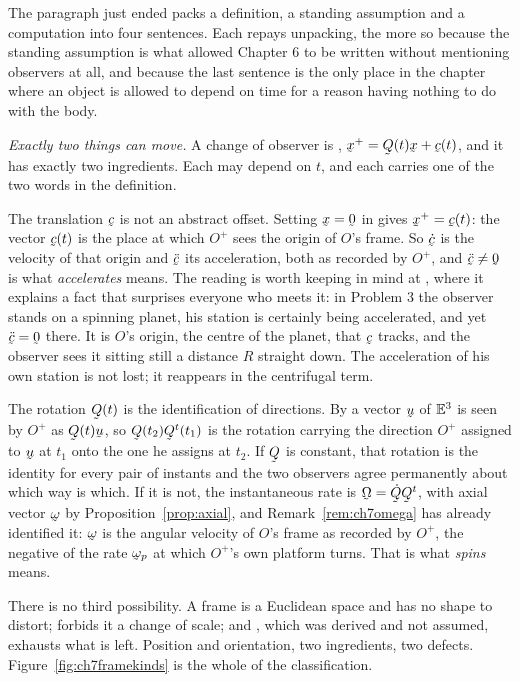 \begin{remark}\label{rem:ch7whatinertial}
The paragraph just ended packs a definition, a standing assumption and a
computation into four sentences. Each repays unpacking, the more so
because the standing assumption is what allowed Chapter 6 to be written
without mentioning observers at all, and because the last sentence is the
only place in the chapter where an object is allowed to depend on time
for a reason having nothing to do with the body.

\emph{Exactly two things can move.} A change of observer is ,
$\bx^{+}=\bQ(t)\bx+\bc(t)$, and it has exactly two ingredients. Each may
depend on $t$, and each carries one of the two words in the definition.

The translation $\bc$ is not an abstract offset. Setting $\bx=\bze$ in
 gives $\bx^{+}=\bc(t)$: the vector $\bc(t)$ is the place at
which $O^{+}$ sees the origin of $O$'s frame. So $\dot\bc$ is the
velocity of that origin and $\ddot\bc$ its acceleration, both as recorded
by $O^{+}$, and $\ddot\bc\neq\bze$ is what \emph{accelerates} means. The
reading is worth keeping in mind at , where it explains a fact
that surprises everyone who meets it: in Problem 3 the observer stands on
a spinning planet, his station is certainly being accelerated, and yet
$\ddot\bc=\bze$ there. It is $O$'s origin, the centre of the planet, that
$\bc$ tracks, and the observer sees it sitting still a distance $R$
straight down. The acceleration of his own station is not lost; it
reappears in the centrifugal term.

The rotation $\bQ(t)$ is the identification of directions. By  a
vector $\bu$ of $\mathbb{E}^{3}$ is seen by $O^{+}$ as $\bQ(t)\bu$, so
$\bQ(t_{2})\bQ^{t}(t_{1})$ is the rotation carrying the direction $O^{+}$
assigned to $\bu$ at $t_{1}$ onto the one he assigns at $t_{2}$. If $\bQ$
is constant, that rotation is the identity for every pair of instants and
the two observers agree permanently about which way is which. If it is
not, the instantaneous rate is $\bOm=\dot\bQ\bQ^{t}$, with axial vector
$\bom$ by Proposition~\ref{prop:axial}, and Remark~\ref{rem:ch7omega} has
already identified it: $\bom$ is the angular velocity of $O$'s frame as
recorded by $O^{+}$, the negative of the rate $\bom_{p}$ at which
$O^{+}$'s own platform turns. That is what \emph{spins} means.

There is no third possibility. A frame is a Euclidean space and has no
shape to distort;  forbids it a change of scale; and ,
which was derived and not assumed, exhausts what is left. Position and
orientation, two ingredients, two defects.
Figure~\ref{fig:ch7framekinds} is the whole of the classification.


\end{remark}

